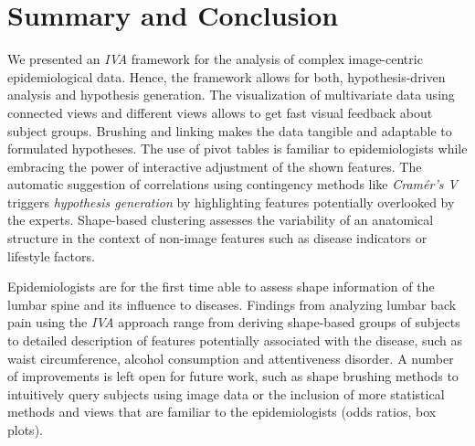 \documentclass[journal]{style/vgtc} 			          %
\newcommand{\rem}[1]{\textcolor{red}{\sout{#1}}}
\newcommand{\com}[1]{\textcolor{orange}{\uline{#1}}}
\begin{document}
\section{Summary and Conclusion}
We presented an \emph{IVA} framework for the analysis of complex image-centric epidemiological data.
%
Hence, the framework allows for both, hypothesis-driven analysis and hypothesis generation.
%
The visualization of multivariate data using connected views and different views allows to get fast visual feedback about subject groups.
%
Brushing and linking makes the data tangible and adaptable to formulated hypotheses.
%
The use of pivot tables is familiar to epidemiologists while embracing the power of interactive adjustment of the shown features.
%
The automatic suggestion of correlations using contingency methods like \emph{Cram\'{e}r's V} triggers \emph{hypothesis generation} by highlighting features potentially overlooked by the experts.
%
Shape-based clustering assesses the variability of an anatomical structure in the context of non-image features such as disease indicators or lifestyle factors.

Epidemiologists are for the first time able to assess shape information of the lumbar spine and its influence to diseases.
%
Findings from analyzing lumbar back pain using the \emph{IVA} approach range from deriving shape-based groups of subjects to detailed description of features potentially associated with the disease, such as waist circumference, alcohol consumption and attentiveness disorder.
%
%
A number of improvements is left open for future work, such as shape brushing methods to intuitively query subjects using image data or the inclusion of more statistical methods and views that are familiar to the epidemiologists (odds ratios, box plots).
\end{document}
